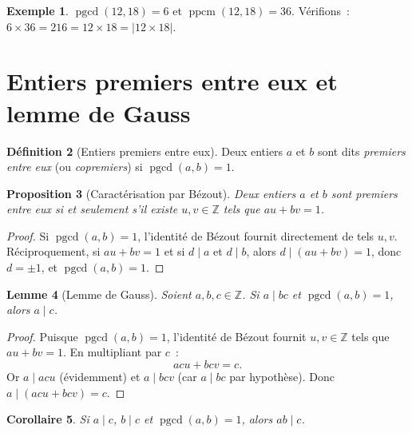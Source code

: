 \documentclass[12pt,a4paper,openany]{book}
\theoremstyle{definition}
\newtheorem{definition}{Définition}[chapter]
\newtheorem{exemple}[definition]{Exemple}
\theoremstyle{plain}
\newtheorem{proposition}[definition]{Proposition}
\newtheorem{lemme}[definition]{Lemme}
\newtheorem{corollaire}[definition]{Corollaire}
\theoremstyle{remark}
\newcommand{\Z}{\mathbb{Z}}
\newcommand{\abs}[1]{\left|#1\right|}
\DeclareMathOperator{\pgcd}{pgcd}
\DeclareMathOperator{\ppcm}{ppcm}
\begin{document}
\begin{exemple}
\label{ex:pgcd_ppcm}
$\pgcd(12, 18) = 6$ et $\ppcm(12, 18) = 36$. Vérifions~:
$6 \times 36 = 216 = 12 \times 18 = \abs{12 \times 18}$. \checkmark
\end{exemple}

\section{Entiers premiers entre eux et lemme de Gauss}
\label{sec:ch1:copremiers}


\begin{definition}[Entiers premiers entre eux]
\label{def:copremiers}
Deux entiers $a$ et $b$ sont dits \emph{premiers entre eux}
(ou \emph{copremiers}) si $\pgcd(a,b) = 1$.
\end{definition}

\begin{proposition}[Caractérisation par Bézout]
\label{prop:copremiers:bezout}
Deux entiers $a$ et $b$ sont premiers entre eux si et seulement s'il existe
$u, v \in \Z$ tels que $au + bv = 1$.
\end{proposition}

\begin{proof}
Si $\pgcd(a,b) = 1$, l'identité de Bézout fournit directement de tels $u, v$.
Réciproquement, si $au + bv = 1$ et si $d \mid a$ et $d \mid b$, alors
$d \mid (au + bv) = 1$, donc $d = \pm 1$, et $\pgcd(a,b) = 1$.
\end{proof}

\begin{lemme}[Lemme de Gauss]
\label{lemme:gauss}
Soient $a, b, c \in \Z$. Si $a \mid bc$ et $\pgcd(a,b) = 1$, alors $a \mid c$.
\end{lemme}

\begin{proof}
Puisque $\pgcd(a,b) = 1$, l'identité de Bézout fournit $u, v \in \Z$ tels que
$au + bv = 1$. En multipliant par $c$~:
\[
  acu + bcv = c.
\]
Or $a \mid acu$ (évidemment) et $a \mid bcv$ (car $a \mid bc$ par hypothèse). Donc
$a \mid (acu + bcv) = c$.
\end{proof}

\begin{corollaire}
\label{cor:gauss:produit_copremiers}
Si $a \mid c$, $b \mid c$ et $\pgcd(a,b) = 1$, alors $ab \mid c$.
\end{corollaire}
\end{document}
